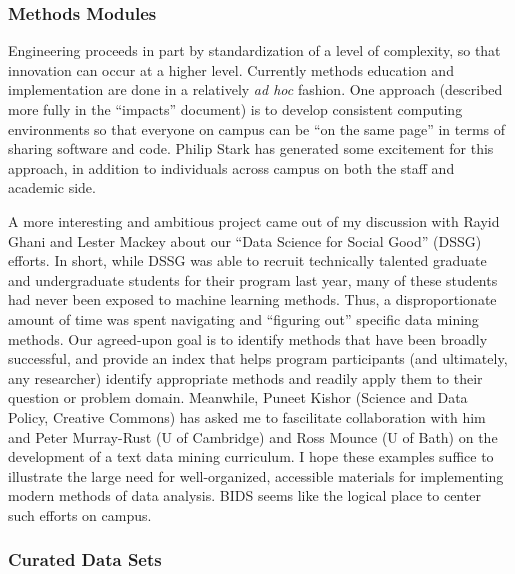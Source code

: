 \subsubsection*{Methods Modules}

Engineering proceeds in part by standardization of a level of complexity, so
that innovation can occur at a higher level. Currently methods education and
implementation are done in a relatively \emph{ad hoc} fashion. One approach
(described more fully in the “impacts” document) is to develop consistent
computing environments so that everyone on campus can be “on the same page” in
terms of sharing software and code. Philip Stark has generated some excitement
for this approach, in addition to individuals across campus on both the staff
and academic side.

A more interesting and ambitious project came out of my discussion with Rayid
Ghani and Lester Mackey about our “Data Science for Social Good” (DSSG) efforts.
In short, while DSSG was able to recruit technically talented graduate and
undergraduate students for their program last year, many of these students had
never been exposed to machine learning methods. Thus, a disproportionate amount
of time was spent navigating and “figuring out” specific data mining methods.
Our agreed-upon goal is to identify methods that have been broadly successful,
and provide an index that helps program participants (and ultimately, any
researcher) identify appropriate methods and readily apply them to their
question or problem domain. Meanwhile, Puneet Kishor (Science and Data Policy,
Creative Commons) has asked me to fascilitate collaboration with him and Peter
Murray-Rust (U of Cambridge) and Ross Mounce (U of Bath) on the development of a
text data mining curriculum.
I hope these examples
suffice to illustrate the large need for well-organized, accessible materials
for implementing modern methods of data analysis. BIDS seems like the logical
place to center such efforts on campus.

\subsubsection*{Curated Data Sets}

